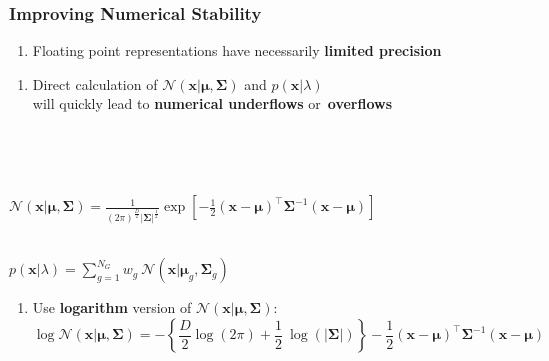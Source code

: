 \documentclass[usenames,dvipsnames]{beamer}
\def\Vec#1{{\boldsymbol{#1}}}
\def\Mat#1{{\boldsymbol{#1}}}
\begin{document}
%
%
%

\begin{frame}
\frametitle{Improving Numerical Stability}

\begin{enumerate}[{~~$\boldsymbol{\bullet}$}]

\item Floating point representations have necessarily {\bf limited precision}

\end{enumerate}

\begin{minipage}{1\textwidth}
\begin{minipage}{0.5\textwidth}
\begin{enumerate}[{~~$\boldsymbol{\bullet}$}]
\item Direct calculation of ${{\mathcal{N}}}( \Vec{x} | \Vec{\mu}, \Mat{\Sigma} )$ and $p(\Vec{x} | \lambda)$\\
will quickly lead to {\bf numerical underflows} or~{\bf overflows}
\end{enumerate}
\end{minipage}
\vline~
\begin{minipage}{0.45\textwidth}
~\\
\begin{tiny}
${{\mathcal{N}}}( \Vec{x} | \Vec{\mu}, \Mat{\Sigma} ) = \frac{1}{ (2\pi)^{\frac{D}{2}} | \Mat{\Sigma}|^{\frac{1}{2}} } \exp \left[ -\frac{1}{2} (\Vec{x}-\Vec{\mu})^\top \Mat{\Sigma}^{-1} (\Vec{x}-\Vec{\mu}) \right]$\\
\end{tiny}
~\\
$p(\Vec{x} | \lambda) = \sum\nolimits_{g=1}^{N_G} w_g ~ {{\mathcal{N}}}( \Vec{x} | \Vec{\mu}_g, \Mat{\Sigma}_g )$\\
\end{minipage}

\end{minipage}

\begin{enumerate}[{~~$\boldsymbol{\bullet}$}]

\item Use {\bf logarithm} version of ${{\mathcal{N}}}( \Vec{x} | \Vec{\mu}, \Mat{\Sigma} )$:
%
\begin{equation*}
  \log {{\mathcal{N}}}( \Vec{x} | \Vec{\mu}, \Mat{\Sigma} )
  = -\left\{\frac{D}{2} \log \left( 2\pi \right) + \frac{1}{2} ~ \log ( |\Mat{\Sigma}| ) \right\}
    -\frac{1}{2} (\Vec{x}-\Vec{\mu})^\top \Mat{\Sigma}^{-1} (\Vec{x}-\Vec{\mu})
\end{equation*}


\end{enumerate}
\end{frame}
\end{document}
